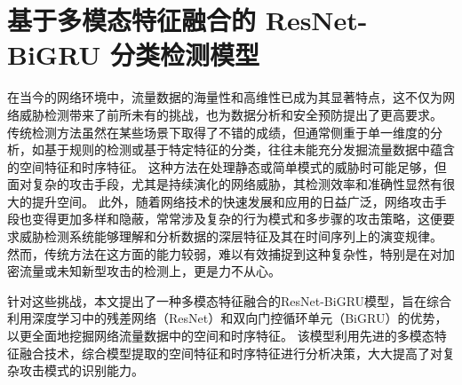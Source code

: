 \chapter{基于多模态特征融合的 ResNet-BiGRU 分类检测模型}
\label{cha:ResNet-BiGRU}
在当今的网络环境中，流量数据的海量性和高维性已成为其显著特点，这不仅为网络威胁检测带来了前所未有的挑战，也为数据分析和安全预防提出了更高要求。
传统检测方法虽然在某些场景下取得了不错的成绩，但通常侧重于单一维度的分析，如基于规则的检测或基于特定特征的分类，往往未能充分发掘流量数据中蕴含的空间特征和时序特征。
这种方法在处理静态或简单模式的威胁时可能足够，但面对复杂的攻击手段，尤其是持续演化的网络威胁，其检测效率和准确性显然有很大的提升空间。
此外，随着网络技术的快速发展和应用的日益广泛，网络攻击手段也变得更加多样和隐蔽，常常涉及复杂的行为模式和多步骤的攻击策略，这便要求威胁检测系统能够理解和分析数据的深层特征及其在时间序列上的演变规律。
然而，传统方法在这方面的能力较弱，难以有效捕捉到这种复杂性，特别是在对加密流量或未知新型攻击的检测上，更是力不从心。\par

针对这些挑战，本文提出了一种多模态特征融合的ResNet-BiGRU模型，旨在综合利用深度学习中的残差网络（ResNet）和双向门控循环单元（BiGRU）的优势，以更全面地挖掘网络流量数据中的空间和时序特征。
该模型利用先进的多模态特征融合技术，综合模型提取的空间特征和时序特征进行分析决策，大大提高了对复杂攻击模式的识别能力。


